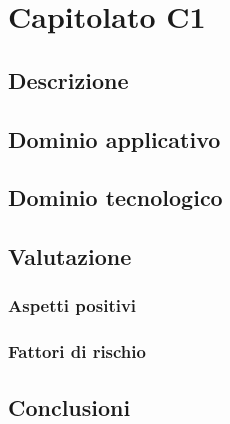 \documentclass[../StudioDiFattibilita.tex]{subfiles}
\begin{document}
	\section{Capitolato C1}
		\subsection{Descrizione}
		\subsection{Dominio applicativo}
		\subsection{Dominio tecnologico}
		\subsection{Valutazione}
			\subsubsection{Aspetti positivi}
			\subsubsection{Fattori di rischio}
			\subsection{Conclusioni}
\end{document}
